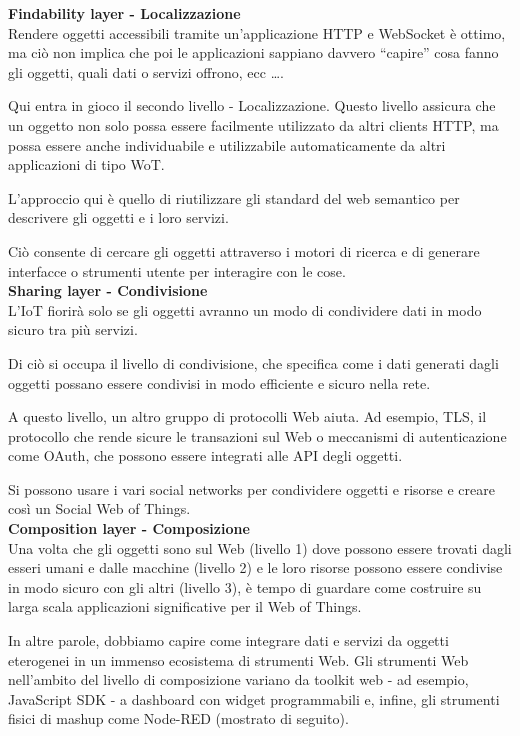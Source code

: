 \textbf{Findability layer - Localizzazione}\\

Rendere oggetti accessibili tramite un'applicazione HTTP e WebSocket è ottimo,
ma ciò non implica che poi le applicazioni sappiano davvero ``capire''
cosa fanno gli oggetti, quali dati o servizi offrono, ecc \dots.

Qui entra in gioco il secondo livello - Localizzazione.
Questo livello assicura che un oggetto non solo possa essere facilmente
utilizzato da altri clients HTTP, ma possa essere anche individuabile e
utilizzabile automaticamente da altri applicazioni di tipo WoT.

L'approccio qui è quello di riutilizzare gli standard del web semantico per
descrivere gli oggetti e i loro servizi.

Ciò consente di cercare gli oggetti attraverso i motori di ricerca e di
generare interfacce o strumenti utente per interagire con le cose. \\

\textbf{Sharing layer - Condivisione}\\

L'IoT fiorirà solo se gli oggetti avranno un modo di
condividere dati in modo sicuro tra più servizi.

Di ciò si occupa il livello di condivisione, che specifica come i dati
generati dagli oggetti possano essere condivisi in modo efficiente e sicuro
nella rete.

A questo livello, un altro gruppo di protocolli Web aiuta.
Ad esempio, TLS, il protocollo che rende sicure le transazioni sul Web o
meccanismi di autenticazione come OAuth, che possono essere integrati
alle API degli oggetti.

Si possono usare i vari social networks per condividere oggetti e risorse
e creare così un Social Web of Things.\\

\textbf{Composition layer - Composizione}\\

Una volta che gli oggetti sono sul Web (livello 1) dove possono
essere trovati dagli esseri umani e dalle macchine (livello 2) e le loro
risorse possono essere condivise in modo sicuro con gli altri (livello 3),
è tempo di guardare come costruire su larga scala applicazioni significative
per il Web of Things.

In altre parole, dobbiamo capire come integrare dati e servizi da oggetti
eterogenei in un immenso ecosistema di strumenti Web.
Gli strumenti Web nell'ambito del livello di composizione variano da toolkit
web - ad esempio, JavaScript SDK - a dashboard con widget programmabili e,
infine, gli strumenti fisici di mashup come Node-RED (mostrato di seguito).

